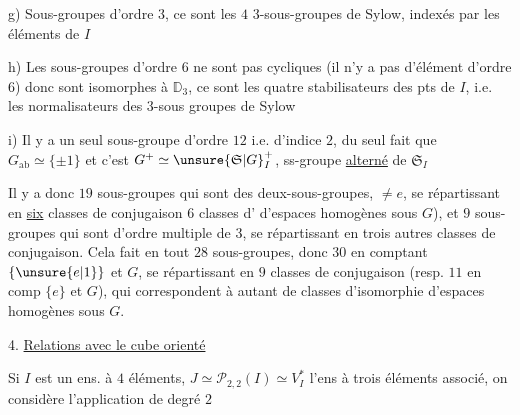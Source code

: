 g) Sous-groupes d'ordre $3$, ce sont les $4$ $3$-sous-groupes de Sylow, indexés par les éléments de $I$

h) Les sous-groupes d'ordre $6$ ne sont pas cycliques (il n'y a pas d'élément d'ordre $6$) donc sont isomorphes à $\mathbb D_3$,  ce sont les quatre stabilisateurs des pts de $I$, i.e. les normalisateurs des $3$-sous groupes de Sylow

i) Il y a un seul sous-groupe d'ordre $12$ i.e. d'indice $2$, du seul fait que  $G_{\mathrm{ab}}\simeq\{\pm1\}$ et c'est $G^+\simeq\unsure{\mathfrak S|G}_I^+$, ss-groupe \uline{alterné} de $\mathfrak S_I$

Il y a donc  $19$ sous-groupes qui sont des deux-sous-groupes, $\ne e$, se répartissant en \uline{six} classes de conjugaison   $6$ classes d' d'espaces homogènes sous $G$), et $9$ sous-groupes  qui sont d'ordre multiple de $3$, se répartissant en trois autres classes de conjugaison. Cela fait en tout $28$ sous-groupes, donc $30$ en comptant $\{\unsure{e|1}\}$ et $G$, se répartissant en $9$ classes de conjugaison (resp. $11$ en comp $\{e\}$ et $G$), qui correspondent à autant de classes d'isomorphie d'espaces homogènes sous $G$.




4. \uline{Relations avec le cube orienté}

Si $I$ est un ens. à $4$ éléments, $J\simeq\mathscr P_{2,2}(I)\simeq V_I^*$ l'ens à trois éléments associé, on considère l'application de degré $2$


